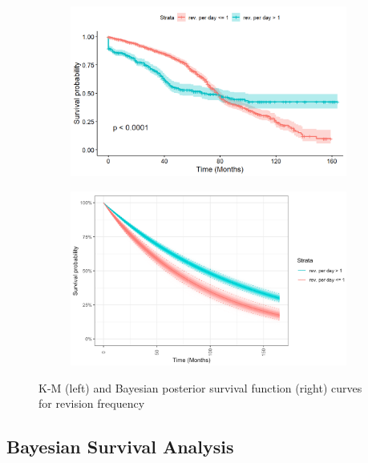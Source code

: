 \documentclass[acmconf]{acmart}
\begin{document}
\begin{figure}[!ht]
    \centering
    \begin{subfigure}[b]{0.45\columnwidth}
        \centering
        \includegraphics[width=\textwidth]{img/KM-rev_freq.jpg}   
        \label{fig:KM_curve_for_revision_frequency}
    \end{subfigure}
    \hfill
    \begin{subfigure}[b]{0.45\columnwidth}
        \centering 
        \includegraphics[width=\textwidth]{img/commit_freq_bayes.png}
        \label{fig:Bayesian_curve_for_revision_frequency}
    \end{subfigure}
    \caption{\small K-M (left) and Bayesian posterior survival function (right) curves for revision frequency} 
    \label{fig:Revision frequency}
\end{figure}

\subsection{Bayesian Survival Analysis}
\end{document}
